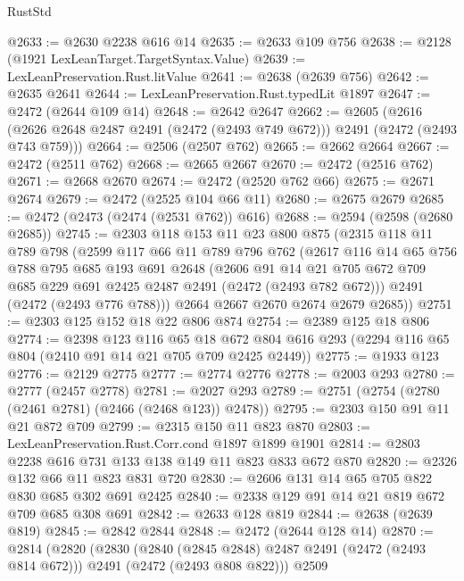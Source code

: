 \begin{lexlean}{RustStd}
\begin{coremodule}
@2633 := @2630 @2238 @616 @14
@2635 := @2633 @109 @756
@2638 := @2128 (@1921 LexLeanTarget.TargetSyntax.Value)
@2639 := LexLeanPreservation.Rust.litValue
@2641 := @2638 (@2639 @756)
@2642 := @2635 @2641
@2644 := LexLeanPreservation.Rust.typedLit @1897
@2647 := @2472 (@2644 @109 @14)
@2648 := @2642 @2647
@2662 := @2605
    (@2616 (@2626 @2648 @2487 @2491 (@2472 (@2493 @749 @672))) @2491 (@2472 (@2493 @743 @759)))
@2664 := @2506 (@2507 @762)
@2665 := @2662 @2664
@2667 := @2472 (@2511 @762)
@2668 := @2665 @2667
@2670 := @2472 (@2516 @762)
@2671 := @2668 @2670
@2674 := @2472 (@2520 @762 @66)
@2675 := @2671 @2674
@2679 := @2472 (@2525 @104 @66 @11)
@2680 := @2675 @2679
@2685 := @2472 (@2473 (@2474 (@2531 @762)) @616)
@2688 := @2594 (@2598 (@2680 @2685))
@2745 := @2303
    @118
    @153
    @11
    @23
    @800
    @875
    (@2315
      @118
      @11
      @789
      @798
      (@2599
        @117
        @66
        @11
        @789
        @796
        @762
        (@2617
          @116
          @14
          @65
          @756
          @788
          @795
          @685
          @193
          @691
          @2648
          (@2606
            @91
            @14
            @21
            @705
            @672
            @709
            @685
            @229
            @691
            @2425
            @2487
            @2491
            (@2472 (@2493 @782 @672)))
          @2491
          (@2472 (@2493 @776 @788)))
        @2664
        @2667
        @2670
        @2674
        @2679
        @2685))
@2751 := @2303 @125 @152 @18 @22 @806 @874
@2754 := @2389 @125 @18 @806
@2774 := @2398
    @123
    @116
    @65
    @18
    @672
    @804
    @616
    @293
    (@2294 @116 @65 @804 (@2410 @91 @14 @21 @705 @709 @2425 @2449))
@2775 := @1933 @123
@2776 := @2129 @2775
@2777 := @2774 @2776
@2778 := @2003 @293
@2780 := @2777 (@2457 @2778)
@2781 := @2027 @293
@2789 := @2751 (@2754 (@2780 (@2461 @2781) (@2466 (@2468 @123)) @2478))
@2795 := @2303 @150 @91 @11 @21 @872 @709
@2799 := @2315 @150 @11 @823 @870
@2803 := LexLeanPreservation.Rust.Corr.cond @1897 @1899 @1901
@2814 := @2803 @2238 @616 @731 @133 @138 @149 @11 @823 @833 @672 @870
@2820 := @2326 @132 @66 @11 @823 @831 @720
@2830 := @2606 @131 @14 @65 @705 @822 @830 @685 @302 @691 @2425
@2840 := @2338 @129 @91 @14 @21 @819 @672 @709 @685 @308 @691
@2842 := @2633 @128 @819
@2844 := @2638 (@2639 @819)
@2845 := @2842 @2844
@2848 := @2472 (@2644 @128 @14)
@2870 := @2814
    (@2820
      (@2830
        (@2840 (@2845 @2848) @2487 @2491 (@2472 (@2493 @814 @672)))
        @2491
        (@2472 (@2493 @808 @822)))
      @2509

\end{coremodule}
\end{lexlean}
